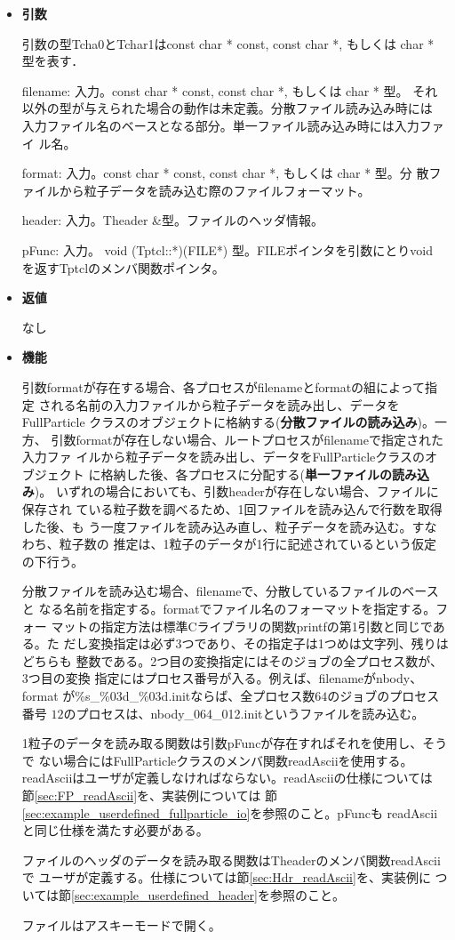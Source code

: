 \begin{itemize}

\item {\bf 引数}

引数の型Tcha0とTchar1はconst char * const, const char *, もしくは char
* 型を表す．

filename: 入力。const char * const, const char *, もしくは char * 型。
それ以外の型が与えられた場合の動作は未定義。分散ファイル読み込み時には
入力ファイル名のベースとなる部分。単一ファイル読み込み時には入力ファイ
ル名。

format: 入力。const char * const, const char *, もしくは char * 型。分
散ファイルから粒子データを読み込む際のファイルフォーマット。

header: 入力。Theader \&型。ファイルのヘッダ情報。

pFunc: 入力。 void (Tptcl::*)(FILE*) 型。FILEポインタを引数にとりvoid
を返すTptclのメンバ関数ポインタ。

\item {\bf 返値}

なし

\item {\bf 機能}

引数formatが存在する場合、各プロセスがfilenameとformatの組によって指定
される名前の入力ファイルから粒子データを読み出し、データをFullParticle
クラスのオブジェクトに格納する(\textbf{分散ファイルの読み込み})。一方、
引数formatが存在しない場合、ルートプロセスがfilenameで指定された入力ファ
イルから粒子データを読み出し、データをFullParticleクラスのオブジェクト
に格納した後、各プロセスに分配する(\textbf{単一ファイルの読み込み})。
いずれの場合においても、引数headerが存在しない場合、ファイルに保存され
ている粒子数を調べるため、1回ファイルを読み込んで行数を取得した後、も
う一度ファイルを読み込み直し、粒子データを読み込む。すなわち、粒子数の
推定は、1粒子のデータが1行に記述されているという仮定の下行う。


分散ファイルを読み込む場合、filenameで、分散しているファイルのベースと
なる名前を指定する。formatでファイル名のフォーマットを指定する。フォー
マットの指定方法は標準Cライブラリの関数printfの第1引数と同じである。た
だし変換指定は必ず3つであり、その指定子は1つめは文字列、残りはどちらも
整数である。2つ目の変換指定にはそのジョブの全プロセス数が、3つ目の変換
指定にはプロセス番号が入る。例えば、filenameがnbody、format
が\%s\_\%03d\_\%03d.initならば、全プロセス数$64$のジョブのプロセス番号
$12$のプロセスは、nbody\_064\_012.initというファイルを読み込む。

1粒子のデータを読み取る関数は引数pFuncが存在すればそれを使用し、そうで
ない場合にはFullParticleクラスのメンバ関数readAsciiを使用する。
readAsciiはユーザが定義しなければならない。readAsciiの仕様については
節\ref{sec:FP_readAscii}を、実装例については
節\ref{sec:example_userdefined_fullparticle_io}を参照のこと。pFuncも
readAsciiと同じ仕様を満たす必要がある。

ファイルのヘッダのデータを読み取る関数はTheaderのメンバ関数readAsciiで
ユーザが定義する。仕様については節\ref{sec:Hdr_readAscii}を、実装例に
ついては節\ref{sec:example_userdefined_header}を参照のこと。

ファイルはアスキーモードで開く。

\end{itemize}


